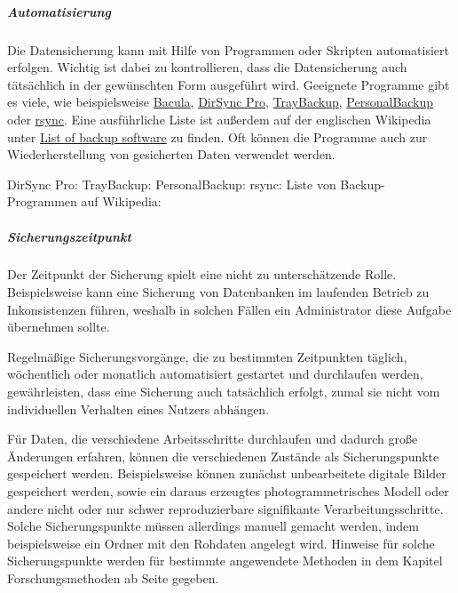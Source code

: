 \subparagraph{Automatisierung} Die Datensicherung kann mit Hilfe von Programmen oder Skripten automatisiert erfolgen. Wichtig ist dabei zu kontrollieren, dass die Datensicherung auch tätsächlich in der gewünschten Form ausgeführt wird. Geeignete Programme gibt es viele, wie beispielsweise \href{http://bacula.org/}{Bacula}, \href{http://www.dirsyncpro.org/}{DirSync Pro}, \href{http://www.traybackup.de}{TrayBackup}, \href{http://personal-backup.rathlev-home.de}{PersonalBackup} oder \href{http://rsync.samba.org/}{rsync}. Eine ausführliche Liste ist außerdem auf der englischen Wikipedia unter \href{http://en.wikipedia.org/wiki/List\_of\_backup\_software}{List of backup software} zu finden. Oft können die Programme auch zur Wiederherstellung von gesicherten Daten verwendet werden.

\begin{flushleft}
	DirSync Pro: 
	TrayBackup: 
	PersonalBackup: 
	rsync: 
	Liste von Backup-Programmen auf Wikipedia:  
\end{flushleft}

\subparagraph{Sicherungszeitpunkt} Der Zeitpunkt der Sicherung spielt eine nicht zu unterschätzende Rolle. Beispielsweise kann eine Sicherung von Datenbanken im laufenden Betrieb zu Inkonsistenzen führen, weshalb in solchen Fällen ein Administrator diese Aufgabe übernehmen sollte.

Regelmäßige Sicherungsvorgänge, die zu bestimmten Zeitpunkten täglich, wöchentlich oder monatlich automatisiert gestartet und durchlaufen werden, gewährleisten, dass eine Sicherung auch tatsächlich erfolgt, zumal sie nicht vom individuellen Verhalten eines Nutzers abhängen.

Für Daten, die verschiedene Arbeitsschritte durchlaufen und dadurch große Änderungen erfahren, können die verschiedenen Zustände als Sicherungspunkte gespeichert werden. Beispielsweise können zunächst unbearbeitete digitale Bilder gespeichert werden, sowie ein daraus erzeugtes photogrammetrisches Modell oder andere nicht oder nur schwer reproduzierbare signifikante Verarbeitungsschritte. Solche Sicherungspunkte müssen allerdings manuell gemacht werden, indem beispielsweise ein Ordner mit den Rohdaten angelegt wird. Hinweise für solche Sicherungspunkte werden für bestimmte angewendete Methoden in dem Kapitel Forschungsmethoden ab Seite \pageref{methoden} gegeben.

